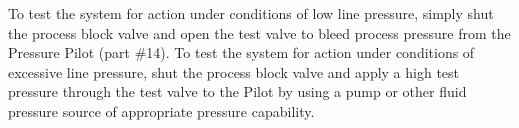 \vskip 10pt

To test the system for action under conditions of low line pressure, simply shut the process block valve and open the test valve to bleed process pressure from the Pressure Pilot (part \#14).  To test the system for action under conditions of excessive line pressure, shut the process block valve and apply a high test pressure through the test valve to the Pilot by using a pump or other fluid pressure source of appropriate pressure capability.




